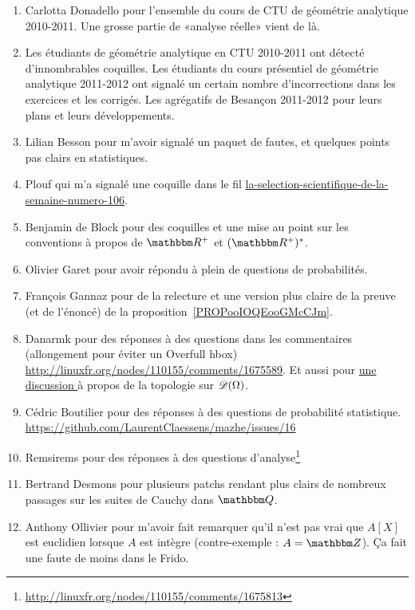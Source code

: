 \begin{enumerate}
    \item
        Carlotta Donadello pour l'ensemble du cours de CTU de géométrie analytique 2010-2011. Une grosse partie de «analyse réelle» vient de là.
    \item
        Les étudiants de géométrie analytique en CTU 2010-2011 ont détecté d'innombrables coquilles. Les étudiants du cours présentiel de géométrie analytique 2011-2012 ont signalé un certain nombre d'incorrections dans les exercices et les corrigés. Les agrégatifs de Besançon 2011-2012 pour leurs plans et leurs développements.
    \item
        Lilian Besson pour m'avoir signalé un paquet de fautes, et quelques points pas clairs en statistiques.
    \item
        Plouf qui m'a signalé une coquille dans le fil \href{http://passeurdesciences.blog.lemonde.fr/2014/01/24/la-selection-scientifique-de-la-semaine-numero-106}{la-selection-scientifique-de-la-semaine-numero-106}.
    \item
        Benjamin de Block pour des coquilles et une mise au point sur les conventions à propos de \( \eR^+\) et \( (\eR^+)^*\).
    \item
        Olivier Garet pour avoir répondu à plein de questions de probabilités.
    \item
        François Gannaz pour de la relecture et une version plus claire de la preuve (et de l'énoncé) de la proposition~\ref{PROPooIOQEooGMcCJm}.
    \item
        Danarmk pour des réponses à des questions dans les commentaires (allongement pour éviter un Overfull hbox) \url{http://linuxfr.org/nodes/110155/comments/1675589}. Et aussi pour \href{ https://github.com/LaurentClaessens/mazhe/issues/87 }{ une discussion } à propos de la topologie sur \( \mathscr{D}(\Omega)\).
    \item
        Cédric Boutilier pour des réponses à des questions de probabilité statistique. \url{https://github.com/LaurentClaessens/mazhe/issues/16}
    \item
        Remsirems pour des réponses à des questions d'analyse\footnote{\url{http://linuxfr.org/nodes/110155/comments/1675813}}
    \item
        Bertrand Desmons pour plusieurs patchs rendant plus clairs de nombreux passages sur les suites de Cauchy dans \( \eQ\).
    \item
        Anthony Ollivier pour m'avoir fait remarquer qu'il n'est pas vrai que \( A[X]\) est euclidien lorsque \( A\) est intègre (contre-exemple : \( A=\eZ\)). Ça fait une faute de moins dans le Frido.

\end{enumerate}
